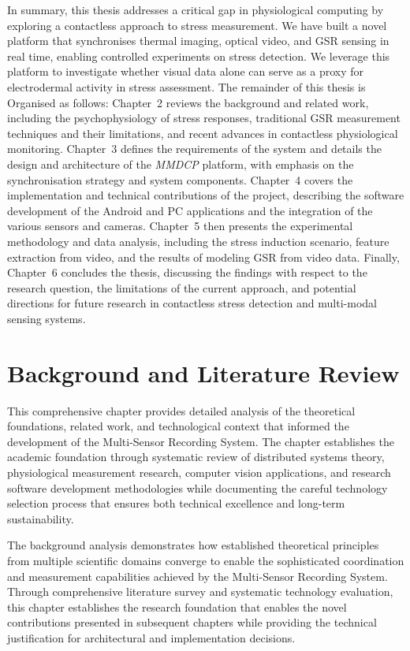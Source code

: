\documentclass[11pt,a4paper]{report}
\begin{document}
In summary, this thesis addresses a critical gap in physiological computing by exploring a contactless approach to stress measurement. We have built a novel platform that synchronises thermal imaging, optical video, and GSR sensing in real time, enabling controlled experiments on stress detection. We leverage this platform to investigate whether visual data alone can serve as a proxy for electrodermal activity in stress assessment. The remainder of this thesis is Organised as follows: Chapter~2 reviews the background and related work, including the psychophysiology of stress responses, traditional GSR measurement techniques and their limitations, and recent advances in contactless physiological monitoring. Chapter~3 defines the requirements of the system and details the design and architecture of the \textit{MMDCP} platform, with emphasis on the synchronisation strategy and system components. Chapter~4 covers the implementation and technical contributions of the project, describing the software development of the Android and PC applications and the integration of the various sensors and cameras. Chapter~5 then presents the experimental methodology and data analysis, including the stress induction scenario, feature extraction from video, and the results of modeling GSR from video data. Finally, Chapter~6 concludes the thesis, discussing the findings with respect to the research question, the limitations of the current approach, and potential directions for future research in contactless stress detection and multi-modal sensing systems.

\chapter{Background and Literature Review}

This comprehensive chapter provides detailed analysis of the theoretical foundations, related work, and technological context that informed the development of the Multi-Sensor Recording System. The chapter establishes the academic foundation through systematic review of distributed systems theory, physiological measurement research, computer vision applications, and research software development methodologies while documenting the careful technology selection process that ensures both technical excellence and long-term sustainability.

The background analysis demonstrates how established theoretical principles from multiple scientific domains converge to enable the sophisticated coordination and measurement capabilities achieved by the Multi-Sensor Recording System. Through comprehensive literature survey and systematic technology evaluation, this chapter establishes the research foundation that enables the novel contributions presented in subsequent chapters while providing the technical justification for architectural and implementation decisions.
\end{document}
